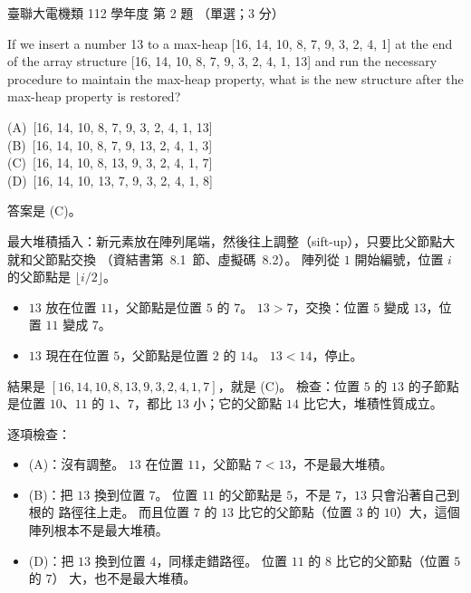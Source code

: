 \begin{pastexam}[label={px:ust-112-ee-ds-02}]{臺聯大電機類 112 學年度 第 2 題}
（單選；3 分）

If we insert a number 13 to a max-heap [16, 14, 10, 8, 7, 9, 3, 2, 4, 1] at the end of the array
structure [16, 14, 10, 8, 7, 9, 3, 2, 4, 1, 13] and run the necessary procedure to maintain the
max-heap property, what is the new structure after the max-heap property is restored?

(A)~[16, 14, 10, 8, 7, 9, 3, 2, 4, 1, 13]\\
(B)~[16, 14, 10, 8, 7, 9, 13, 2, 4, 1, 3]\\
(C)~[16, 14, 10, 8, 13, 9, 3, 2, 4, 1, 7]\\
(D)~[16, 14, 10, 13, 7, 9, 3, 2, 4, 1, 8]
\end{pastexam}

\begin{pastsoln}
答案是 (C)。

最大堆積插入：新元素放在陣列尾端，然後往上調整（sift-up），只要比父節點大就和父節點交換
（資結書第~8.1~節、虛擬碼~8.2）。 陣列從 $1$ 開始編號，位置 $i$ 的父節點是 $\lfloor i/2 \rfloor$。

\begin{itemize}
\item $13$ 放在位置 $11$，父節點是位置 $5$ 的 $7$。 $13 > 7$，交換：位置 $5$ 變成 $13$，位置 $11$
變成 $7$。
\item $13$ 現在在位置 $5$，父節點是位置 $2$ 的 $14$。 $13 < 14$，停止。
\end{itemize}
結果是 $[16, 14, 10, 8, 13, 9, 3, 2, 4, 1, 7]$，就是 (C)。 檢查：位置 $5$ 的 $13$ 的子節點是位置
$10$、$11$ 的 $1$、$7$，都比 $13$ 小；它的父節點 $14$ 比它大，堆積性質成立。

逐項檢查：
\begin{itemize}
\item (A)：沒有調整。 $13$ 在位置 $11$，父節點 $7 < 13$，不是最大堆積。
\item (B)：把 $13$ 換到位置 $7$。 位置 $11$ 的父節點是 $5$，不是 $7$，$13$ 只會沿著自己到根的
路徑往上走。 而且位置 $7$ 的 $13$ 比它的父節點（位置 $3$ 的 $10$）大，這個陣列根本不是最大堆積。
\item (D)：把 $13$ 換到位置 $4$，同樣走錯路徑。 位置 $11$ 的 $8$ 比它的父節點（位置 $5$ 的 $7$）
大，也不是最大堆積。
\end{itemize}
\end{pastsoln}
